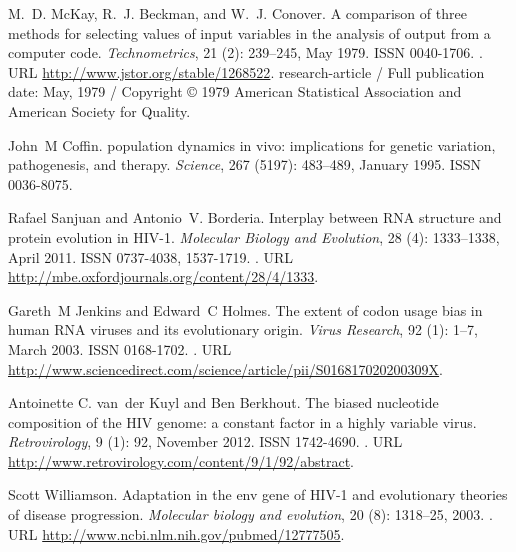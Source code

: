 \documentclass[11pt]{article}
\begin{document}
\begin{thebibliography}{48}
M.~D. {McKay}, R.~J. Beckman, and W.~J. Conover.
\newblock A comparison of three methods for selecting values of input variables
  in the analysis of output from a computer code.
\newblock \emph{Technometrics}, 21 (2): 239--245, May 1979.
\newblock ISSN 0040-1706.
\newblock {}.
\newblock URL \url{http://www.jstor.org/stable/1268522}.
 research-article / Full publication date: May, 1979 /
  Copyright © 1979 American Statistical Association and American Society for
  Quality.

John~M Coffin.
 population dynamics in vivo: implications for genetic
  variation, pathogenesis, and therapy.
\newblock \emph{Science}, 267 (5197): 483--489, January 1995.
\newblock ISSN 0036-8075.

Rafael Sanjuan and Antonio~V. Borderia.
\newblock Interplay between {RNA} structure and protein evolution in {HIV-1}.
\newblock \emph{Molecular Biology and Evolution}, 28 (4):
  1333--1338, April 2011.
\newblock ISSN 0737-4038, 1537-1719.
\newblock {}.
\newblock URL \url{http://mbe.oxfordjournals.org/content/28/4/1333}.

Gareth~M Jenkins and Edward~C Holmes.
\newblock The extent of codon usage bias in human {RNA} viruses and its
  evolutionary origin.
\newblock \emph{Virus Research}, 92 (1): 1--7, March 2003.
\newblock ISSN 0168-1702.
\newblock {}.
\newblock URL
  \url{http://www.sciencedirect.com/science/article/pii/S016817020200309X}.

Antoinette C. van~der Kuyl and Ben Berkhout.
\newblock The biased nucleotide composition of the {HIV} genome: a constant
  factor in a highly variable virus.
\newblock \emph{Retrovirology}, 9 (1): 92, November 2012.
\newblock ISSN 1742-4690.
\newblock {}.
\newblock URL \url{http://www.retrovirology.com/content/9/1/92/abstract}.

Scott Williamson.
\newblock Adaptation in the env gene of {HIV-1} and evolutionary theories of
  disease progression.
\newblock \emph{Molecular biology and evolution}, 20 (8):
  1318--25, 2003.
\newblock {}.
\newblock URL \url{http://www.ncbi.nlm.nih.gov/pubmed/12777505}.


\end{thebibliography}
\end{document}
